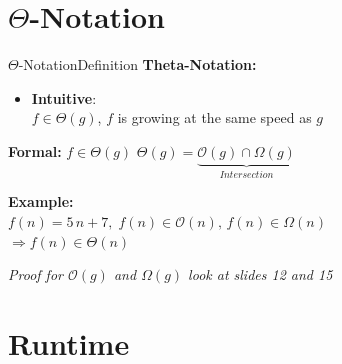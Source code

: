 
\section{\texorpdfstring{$\Theta$}{Theta}-Notation}

\begin{frame}{$\Theta$-Notation}{Definition}
  \textbf{Theta-Notation:}
  \begin{itemize}
    \item
      \textbf{Intuitive}:\\
      $f \in \Theta(g)$, $f$ is growing at the same speed as $g$
  \end{itemize}
 	\begin{block}{\textbf{Formal:} $f \in \Theta(g)$}
 		$\Theta(g) = \underbrace{\mathcal O(g) \cap \Omega(g)}_{Intersection}$
 	\end{block}
  \textbf{Example:}\\
  \hspace*{1.5em}$f(n) = 5 \, n + 7, \;
    f(n) \in \mathcal{O}(n), \,
    f(n) \in \Omega(n)$\\
  \hspace*{3.0em}$\Rightarrow f(n) \in \Theta(n)$\\[0.5em]
  \begin{center}
   \textit{Proof for $\mathcal{O}(g)$ and $\Omega(g)$ look at slides 12 and 15}
  \end{center}
\end{frame}


\section{Runtime}


